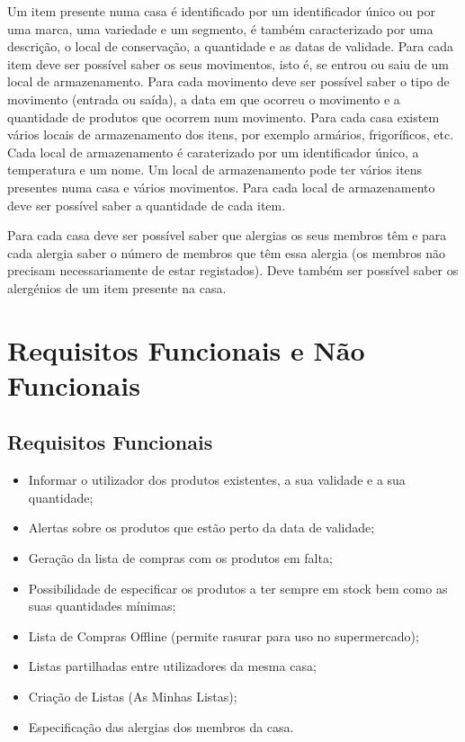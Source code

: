 Um item presente numa casa é identificado por um identificador único ou por uma marca, uma variedade e um segmento, é também caracterizado por uma descrição, o local de conservação, a quantidade e as datas de validade. Para cada item deve ser possível saber os seus movimentos, isto é, se entrou ou saiu de um local de armazenamento. Para cada movimento deve ser possível saber o tipo de movimento (entrada ou saída), a data em que ocorreu o movimento e a quantidade de produtos que ocorrem num movimento.
Para cada casa existem vários locais de armazenamento dos itens, por exemplo armários, frigoríficos, etc. Cada local de armazenamento é caraterizado por um identificador único, a temperatura e um nome. Um local de armazenamento pode ter vários itens presentes numa casa e vários movimentos. Para cada local de armazenamento deve ser possível saber a quantidade de cada item.

Para cada casa deve ser possível saber que alergias os seus membros têm e para cada alergia saber o número de membros que têm essa alergia (os membros não precisam necessariamente de estar registados). Deve também ser possível saber os alergénios de um item presente na casa.



%
%
\section{Requisitos Funcionais e Não Funcionais} \label{sec22}

\subsection{Requisitos Funcionais}
\begin{itemize}
	\item Informar o utilizador dos produtos existentes, a sua validade e a sua quantidade;
	\item Alertas sobre os produtos que estão perto da data de validade;
	\item Geração da lista de compras com os produtos em falta;
	\item Possibilidade de especificar os produtos a ter sempre em stock bem como as suas quantidades mínimas;	
	\item Lista de Compras Offline (permite rasurar para uso no supermercado);
	\item Listas partilhadas entre utilizadores da mesma casa;
	\item Criação de Listas (As Minhas Listas);
	\item Especificação das alergias dos membros da casa.
\end{itemize}


